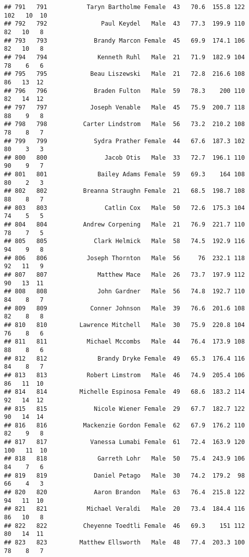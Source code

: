 \documentclass[
]{article}
\begin{document}
\begin{verbatim}
## 791   791           Taryn Bartholme Female  43   70.6  155.8 122 102   10  10
## 792   792               Paul Keydel   Male  43   77.3  199.9 110  82   10   8
## 793   793             Brandy Marcon Female  45   69.9  174.1 106  82   10   8
## 794   794              Kenneth Ruhl   Male  21   71.9  182.9 104  78    6   6
## 795   795            Beau Liszewski   Male  21   72.8  216.6 108  86   13  12
## 796   796             Braden Fulton   Male  59   78.3    200 110  82   14  12
## 797   797            Joseph Venable   Male  45   75.9  200.7 118  88    9   8
## 798   798          Carter Lindstrom   Male  56   73.2  210.2 108  78    8   7
## 799   799             Sydra Prather Female  44   67.6  187.3 102  80    3   3
## 800   800                Jacob Otis   Male  33   72.7  196.1 110  90    9   7
## 801   801              Bailey Adams Female  59   69.3    164 108  80    2   3
## 802   802          Breanna Straughn Female  21   68.5  198.7 108  88    8   7
## 803   803                Catlin Cox   Male  50   72.6  175.3 104  74    5   5
## 804   804          Andrew Corpening   Male  21   76.9  221.7 110  78    7   5
## 805   805             Clark Helmick   Male  58   74.5  192.9 116  94    9   8
## 806   806           Joseph Thornton   Male  56     76  232.1 118  92   11   9
## 807   807              Matthew Mace   Male  26   73.7  197.9 112  90   13  11
## 808   808              John Gardner   Male  56   74.8  192.7 110  84    8   7
## 809   809            Conner Johnson   Male  39   76.6  201.6 108  82    8   8
## 810   810         Lawrence Mitchell   Male  30   75.9  220.8 104  76    8   6
## 811   811           Michael Mccombs   Male  44   76.4  173.9 108  88    8   6
## 812   812              Brandy Dryke Female  49   65.3  176.4 116  84    8   7
## 813   813           Robert Limstrom   Male  46   74.9  205.4 106  86   11  10
## 814   814         Michelle Espinosa Female  49   68.6  183.2 114  92   14  12
## 815   815             Nicole Wiener Female  29   67.7  182.7 122  90   14  14
## 816   816          Mackenzie Gordon Female  62   67.9  176.2 110  82    9   8
## 817   817            Vanessa Lumabi Female  61   72.4  163.9 120 100   11  10
## 818   818              Garreth Lohr   Male  50   75.4  243.9 106  84    7   6
## 819   819             Daniel Petago   Male  30   74.2  179.2  98  66    4   3
## 820   820             Aaron Brandon   Male  63   76.4  215.8 122  94   11  10
## 821   821           Michael Veraldi   Male  20   73.4  184.4 116  86   10   8
## 822   822          Cheyenne Toedtli Female  46   69.3    151 112  80   14  11
## 823   823         Matthew Ellsworth   Male  48   77.4  203.3 100  78    8   7

\end{verbatim}
\end{document}
